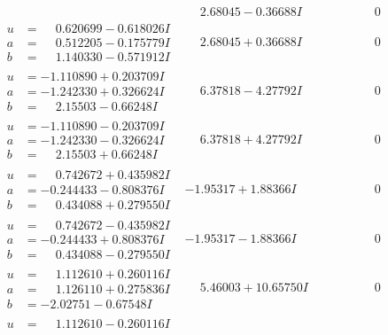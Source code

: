 \documentclass[1p]{elsarticle_modified}
\theoremstyle{definition}
\begin{document}
$$\begin{array}{c|c|c}
 & \phantom{-}2.68045 - 0.36688 I & \phantom{-0.000000 } 0 \\ \hline\begin{aligned}
u &= \phantom{-}0.620699 - 0.618026 I \\
a &= \phantom{-}0.512205 - 0.175779 I \\
b &= \phantom{-}1.140330 - 0.571912 I\end{aligned}
 & \phantom{-}2.68045 + 0.36688 I & \phantom{-0.000000 } 0 \\ \hline\begin{aligned}
u &= -1.110890 + 0.203709 I \\
a &= -1.242330 + 0.326624 I \\
b &= \phantom{-}2.15503 - 0.66248 I\end{aligned}
 & \phantom{-}6.37818 - 4.27792 I & \phantom{-0.000000 } 0 \\ \hline\begin{aligned}
u &= -1.110890 - 0.203709 I \\
a &= -1.242330 - 0.326624 I \\
b &= \phantom{-}2.15503 + 0.66248 I\end{aligned}
 & \phantom{-}6.37818 + 4.27792 I & \phantom{-0.000000 } 0 \\ \hline\begin{aligned}
u &= \phantom{-}0.742672 + 0.435982 I \\
a &= -0.244433 - 0.808376 I \\
b &= \phantom{-}0.434088 + 0.279550 I\end{aligned}
 & -1.95317 + 1.88366 I & \phantom{-0.000000 } 0 \\ \hline\begin{aligned}
u &= \phantom{-}0.742672 - 0.435982 I \\
a &= -0.244433 + 0.808376 I \\
b &= \phantom{-}0.434088 - 0.279550 I\end{aligned}
 & -1.95317 - 1.88366 I & \phantom{-0.000000 } 0 \\ \hline\begin{aligned}
u &= \phantom{-}1.112610 + 0.260116 I \\
a &= \phantom{-}1.126110 + 0.275836 I \\
b &= -2.02751 - 0.67548 I\end{aligned}
 & \phantom{-}5.46003 + 10.65750 I & \phantom{-0.000000 } 0 \\ \hline\begin{aligned}
u &= \phantom{-}1.112610 - 0.260116 I \\

\end{aligned}
\end{array}$$
\end{document}
